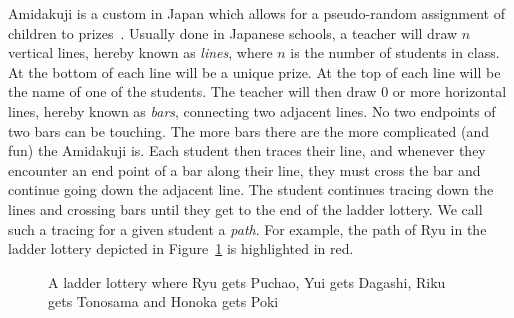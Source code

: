 
\vspace{-5mm}
Amidakuji is a custom in Japan which 
allows for a pseudo-random assignment of children to prizes~\cite{A1}. 
Usually done in Japanese schools, a teacher will draw $n$ vertical lines, 
hereby known as \emph{lines}, where $n$ is the number of students in class. 
At the bottom of each line will be a unique prize. At the top of each line will be the name of one of the students.  
The teacher will then draw 0 or more horizontal lines, hereby known as \emph{bars}, 
connecting two adjacent lines. No two endpoints of two bars can be touching. 
The more bars there are the more complicated (and fun) 
the Amidakuji is. Each student then traces 
their line, and whenever they encounter an end point of a bar along their line, 
they must cross the bar and continue going down the adjacent line. 
The student continues tracing down the lines and crossing bars 
until they get to the end of the ladder lottery. We call such a tracing for a given student 
a \emph{path}. For example, the path of Ryu in the ladder lottery depicted in Figure~\ref{fig:aa} is highlighted in red. 
\begin{center}
\vspace{-5mm}
\begin{figure}[h]
	\centering
\caption{A ladder lottery where Ryu gets Puchao, Yui gets Dagashi, Riku gets Tonosama and Honoka gets Poki}
\label{fig:aa}
\end{figure}
\end{center}

